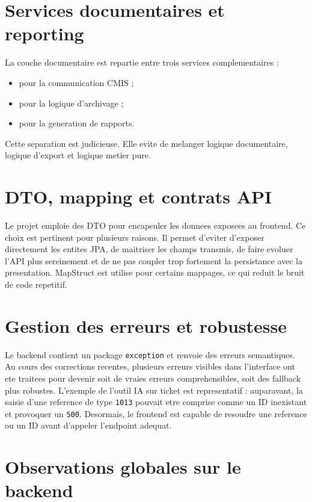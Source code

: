 \section{Services documentaires et reporting}

La couche documentaire est repartie entre trois services complementaires :

\begin{itemize}[leftmargin=1.2cm]
  \item {} pour la communication CMIS ;
  \item {} pour la logique d'archivage ;
  \item {} pour la generation de rapports.
\end{itemize}

Cette separation est judicieuse. Elle evite de melanger logique documentaire, logique d'export et logique metier pure.

\section{DTO, mapping et contrats API}

Le projet emploie des DTO pour encapsuler les donnees exposees au frontend. Ce choix est pertinent pour plusieurs raisons. Il permet d'eviter d'exposer directement les entites JPA, de maitriser les champs transmis, de faire evoluer l'API plus sereinement et de ne pas coupler trop fortement la persistance avec la presentation. MapStruct est utilise pour certains mappages, ce qui reduit le bruit de code repetitif.

\section{Gestion des erreurs et robustesse}

Le backend contient un package \texttt{exception} et renvoie des erreurs semantiques. Au cours des corrections recentes, plusieurs erreurs visibles dans l'interface ont ete traitees pour devenir soit de vraies erreurs comprehensibles, soit des fallback plus robustes. L'exemple de l'outil IA sur ticket est representatif : auparavant, la saisie d'une reference de type \texttt{1013} pouvait etre comprise comme un ID inexistant et provoquer un \texttt{500}. Desormais, le frontend est capable de resoudre une reference ou un ID avant d'appeler l'endpoint adequat.

\section{Observations globales sur le backend}

